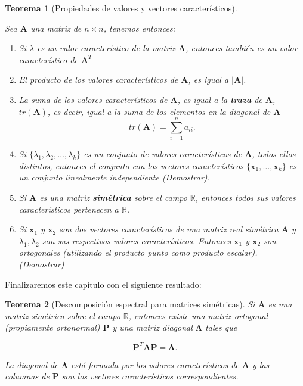 \documentclass[11pt]{report}
\theoremstyle{break}
\newtheorem{teorema}{Teorema}[chapter]
\theoremstyle{break}
\newcommand{\mbb}[1]{$\mathbb{#1}$}
\newcommand{\matdim}[2]{$#1 \times #2$}
\begin{document}
\begin{teorema}[Propiedades de valores y vectores característicos]
\label{teorema:propiedades eigenvalues}

Sea $\bm{A}$ una matriz de \matdim{n}{n}, tenemos entonces:
\begin{enumerate}[label=\alph*)]
\item Si $\lambda$ es un valor característico de la matriz $\bm{A}$, entonces también es un valor característico de $\bm{A}^{T}$

\item El producto de los valores característicos de $\bm{A}$, es igual a $|\bm{A}|$.

\item La suma de los valores característicos de $\bm{A}$, es igual a la \textbf{traza} de $\bm{A}$, $tr(\bm{A})$, es decir, igual a la suma de los elementos en la diagonal de $\bm{A}$
$$ tr(\bm{A}) = \sum_{i = 1}^{n} a_{ii}.$$

\item Si $\{\lambda_{1}, \lambda_{2}, \ldots, \lambda_{k} \}$ es un conjunto de valores característicos de $\bm{A}$, todos ellos distintos, entonces el conjunto con los vectores característicos $\{\bm{x}_1, \ldots, \bm{x}_k \}$ es un conjunto linealmente independiente (Demostrar). %

\item Si $\bm{A}$ es una matriz \textbf{simétrica} sobre el campo \mbb{R}, entonces todos sus valores característicos pertenecen a \mbb{R}.

\item Si $\bm{x}_1$ y $\bm{x}_2$ son dos vectores característicos de una matriz real simétrica $\bm{A}$ y $\lambda_1, \lambda_2$ son sus respectivos valores característicos. Entonces $\bm{x}_1$ y $\bm{x}_2$ son ortogonales (utilizando el producto punto como producto escalar). (Demostrar)
\end{enumerate}

\end{teorema}

Finalizaremos este capítulo con el siguiente resultado:

\begin{teorema}[Descomposición espectral para matrices simétricas]
\label{teorema:descomposicion espectral}
Si $\bm{A}$ es una matriz simétrica sobre el campo \mbb{R}, entonces existe una matriz ortogonal (propiamente ortonormal) $\bm{P}$ y una matriz diagonal $\bm{\Lambda}$ tales que

$$\bm{P}^{T} \bm{A} \bm{P} = \bm{\Lambda}.$$

La diagonal de $\bm{\Lambda}$ está formada por los valores característicos de $\bm{A}$ y las columnas de $\bm{P}$ son los vectores característicos correspondientes.
\end{teorema}
\end{document}
